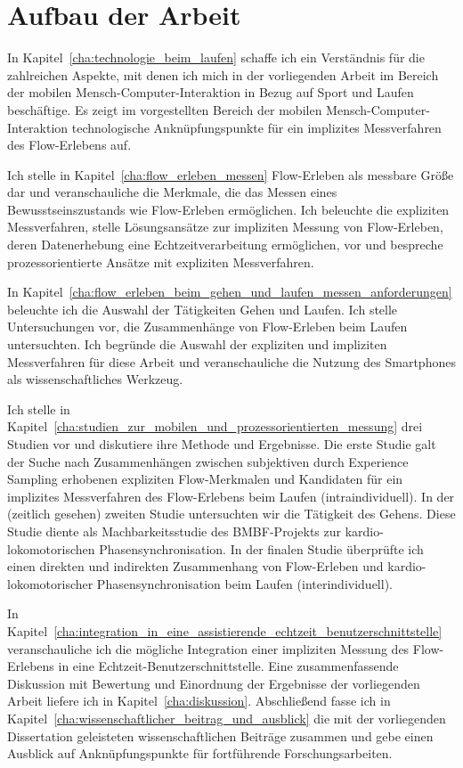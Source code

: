 

\section{Aufbau der Arbeit} 

\label{sec:aufbau_der_arbeit}

In Kapitel~\ref{cha:technologie_beim_laufen} schaffe ich ein Verständnis für die zahlreichen Aspekte, mit denen ich mich in der vorliegenden Arbeit im Bereich der mobilen Mensch-Computer-Interaktion in Bezug auf Sport und Laufen beschäftige. Es zeigt im vorgestellten Bereich der mobilen Mensch-Computer-Interaktion technologische Anknüpfungspunkte für ein implizites Messverfahren des Flow-Erlebens auf.

Ich stelle in Kapitel~\ref{cha:flow_erleben_messen} Flow-Erleben als messbare Größe dar und veranschauliche die Merkmale, die das Messen eines Bewusstseinszustands wie Flow-Erleben ermöglichen. Ich beleuchte die expliziten Messverfahren, stelle Lösungsansätze zur impliziten Messung von Flow-Erleben, deren Datenerhebung eine Echtzeitverarbeitung ermöglichen, vor und bespreche prozessorientierte Ansätze mit expliziten Messverfahren.

In Kapitel~\ref{cha:flow_erleben_beim_gehen_und_laufen_messen_anforderungen} beleuchte ich die Auswahl der Tätigkeiten Gehen und Laufen. Ich stelle Untersuchungen vor, die Zusammenhänge von Flow-Erleben beim Laufen untersuchten. Ich begründe die Auswahl der expliziten und impliziten Messverfahren für diese Arbeit und veranschauliche die Nutzung des Smartphones als wissenschaftliches Werkzeug.

Ich stelle in Kapitel~\ref{cha:studien_zur_mobilen_und_prozessorientierten_messung} drei Studien vor und diskutiere ihre Methode und Ergebnisse. Die erste Studie galt der Suche nach Zusammenhängen zwischen subjektiven durch Experience Sampling erhobenen expliziten Flow-Merkmalen und Kandidaten für ein implizites Messverfahren des Flow-Erlebens beim Laufen (intraindividuell). In der (zeitlich gesehen) zweiten Studie untersuchten wir die Tätigkeit des Gehens. Diese Studie diente als Machbarkeitsstudie des \acs{BMBF}-Projekts zur kardio-lokomotorischen Phasensynchronisation. In der finalen Studie überprüfte ich einen direkten und indirekten Zusammenhang von Flow-Erleben und kardio-lokomotorischer Phasensynchronisation beim Laufen (interindividuell).

In Kapitel~\ref{cha:integration_in_eine_assistierende_echtzeit_benutzerschnittstelle} veranschauliche ich die mögliche Integration einer impliziten Messung des Flow-Erlebens in eine Echtzeit-Benutzerschnittstelle. Eine zusammenfassende Diskussion mit Bewertung und Einordnung der Ergebnisse der vorliegenden Arbeit liefere ich in Kapitel~\ref{cha:diskussion}. Abschließend fasse ich in Kapitel~\ref{cha:wissenschaftlicher_beitrag_und_ausblick} die mit der vorliegenden Dissertation geleisteten wissenschaftlichen Beiträge zusammen und gebe einen Ausblick auf Anknüpfungspunkte für fortführende Forschungsarbeiten.

